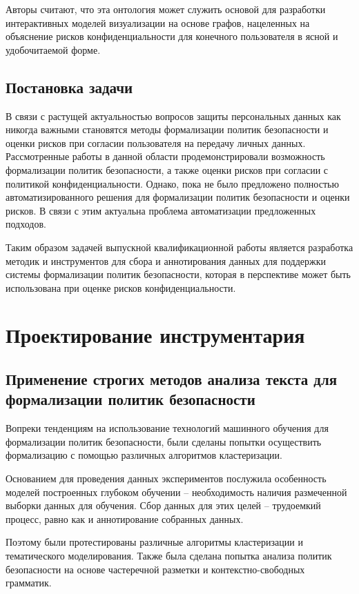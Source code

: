 \documentclass[../main]{subfiles}
\begin{document}
Авторы \cite{P2Onto} считают, что эта онтология может служить основой для разработки интерактивных моделей визуализации на основе графов, нацеленных на объяснение рисков конфиденциальности для конечного пользователя в ясной и удобочитаемой форме. 

\subsection{Постановка задачи}
В связи с растущей актуальностью вопросов защиты персональных данных как никогда важными становятся методы формализации политик безопасности и оценки рисков при согласии пользователя на передачу личных данных. Рассмотренные работы в данной области продемонстрировали возможность формализации политик безопасности, а также оценки рисков при согласии с политикой конфиденциальности. Однако, пока не было предложено полностью автоматизированного решения для формализации политик безопасности и оценки рисков. В связи с этим актуальна проблема автоматизации предложенных подходов. 

Таким образом задачей выпускной квалификационной работы является разработка методик и инструментов для сбора и аннотирования данных для поддержки системы формализации политик безопасности, которая в перспективе может быть использована при оценке рисков конфиденциальности.

\newpage
\section{Проектирование инструментария}

\subsection{Применение строгих методов анализа текста для формализации политик безопасности}

Вопреки тенденциям на использование технологий машинного обучения для формализации политик безопасности, были сделаны попытки осуществить формализацию с помощью различных алгоритмов кластеризации.

Основанием для проведения данных экспериментов послужила особенность моделей построенных глубоком обучении -- необходимость наличия размеченной выборки данных для обучения. Сбор данных для этих целей -- трудоемкий процесс, равно как и аннотирование собранных данных.

Поэтому были протестированы различные алгоритмы кластеризации и тематического моделирования. Также была сделана попытка анализа политик безопасности на основе частеречной разметки и контекстно-свободных грамматик.
\end{document}

